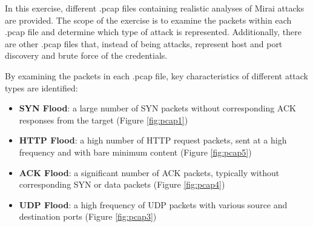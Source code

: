 In this exercise, different .pcap files containing realistic analyses of Mirai attacks are provided. The scope of the exercise is to examine the packets within each .pcap file and determine which type of attack is represented.
Additionally, there are other .pcap files that, instead of being attacks, represent host and port discovery and brute force of the credentials.

By examining the packets in each .pcap file, key characteristics of different attack types are identified:
\begin{itemize}
	\item \textbf{SYN Flood}: a large number of SYN packets without corresponding ACK responses from the target (Figure \ref{fig:pcap1})
	\item \textbf{HTTP Flood}: a high number of HTTP request packets, sent at a high frequency and with bare minimum content (Figure \ref{fig:pcap5})
	\item \textbf{ACK Flood}: a significant number of ACK packets, typically without corresponding SYN or data packets (Figure \ref{fig:pcap4})
	\item \textbf{UDP Flood}: a high frequency of UDP packets with various source and destination ports (Figure \ref{fig:pcap3})
\end{itemize}

